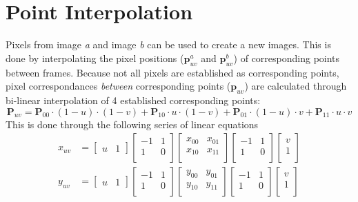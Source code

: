 \documentclass{report}
\begin{document}
\chapter{Point Interpolation}
\par
Pixels from image \textit{a} and image \textit{b} can be used to create a new images. This is done by interpolating the pixel positions ($\mathbf{p}^{a}_{uv}$ and $\mathbf{p}^{b}_{uv}$) of corresponding points between frames. Because not all pixels are established as corresponding points, pixel correspondances \textit{between} corresponding points ($\mathbf{p}_{uv}$) are calculated through bi-linear interpolation of 4 established corresponding points: 
\begin{equation*}
\mathbf{P}_{uv} = 
\mathbf{P}_{00}\cdot (1-u)\cdot (1-v)+\mathbf{P}_{10}\cdot u \cdot (1-v)+
\mathbf{P}_{01}\cdot (1-u)\cdot v +\mathbf{P}_{11}\cdot u \cdot v
\end{equation*}
This is done through the following series of linear equations
\begin{equation*}\begin{split}
x_{uv} &= 
\begin{bmatrix}u & 1\end{bmatrix}
\begin{bmatrix}-1 & 1\\ 1 & 0\\\end{bmatrix}
\begin{bmatrix}x_{00} & x_{01} \\ x_{10} & x_{11}\\\end{bmatrix}
\begin{bmatrix}-1 & 1\\ 1 & 0\\\end{bmatrix}
\begin{bmatrix}v \\ 1\\\end{bmatrix}\\
y_{uv} &= 
\begin{bmatrix}u & 1\end{bmatrix}
\begin{bmatrix}-1 & 1\\ 1 & 0\\\end{bmatrix}
\begin{bmatrix}y_{00} & y_{01} \\ y_{10} & y_{11}\\\end{bmatrix}
\begin{bmatrix}-1 & 1\\ 1 & 0\\\end{bmatrix}
\begin{bmatrix}v \\ 1\\\end{bmatrix}\\
\end{split}\end{equation*}
\end{document}
